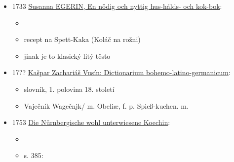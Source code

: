 \begin{itemize}
\begin{itemize}
    \begin{itemize}
    \tightlist
    \item
      Str. 374 citované knihy (s. 59 u Zíbrta):
    \item
      České koláčky (Böhmische Küchlein) Vezme se mléko, mouka a vejce a
      zadělá se těsto. Přidá se trochu droždí a nechá se trochu
      vykynout, pak se zpracuje, aby byl pěkně pevný, a vyválí se do
      šířky. Posype se rozinkami, skořicí, muškátovým květem a
      kardamomem.
    \item
      Poté se vezme rožeň, který je k tomu určen, a opéká se nad ohněm.
      Potře se sádlem, těsto se na něj přehodí a opéká. Na začátku se
      může těsto převázat papírem, aby -- dokud je měkké -- nespadlo z
      rožně.
    \item
      zní to jako kopie Thiemena
    \end{itemize}
  \end{itemize}
\item
  1733
  \href{https://web.archive.org/web/20201229075639/http://www.kurtos.eu/dl/spettakaka.pdf}{Susanna
  EGERIN, En nödig och nyttig hus-hålds- och kok-bok}:

  \begin{itemize}
  \tightlist
  \item
  \item
    recept na Spett-Kaka (Koláč na rožni)
  \item
    jinak je to klasický litý těsto
  \end{itemize}
\item
  17??
  \href{https://bara.ujc.cas.cz/slovniky/VusSlovBLG1729/vusin22.html\#CTX14944}{Kašpar
  Zachariáš Vusín: Dictionarium bohemo-latino-germanicum}:

  \begin{itemize}
  \tightlist
  \item
    slovník, 1. polovina 18. století
  \item
    Vaječník \textbar{} Wagečnjk/ m. Obeliæ, f. p. Spieß-kuchen. m.
  \end{itemize}
\item
  1753
  \href{https://www.digitale-sammlungen.de/de/view/bsb11349274?q=(prugel-krapfen\%20)&page=392\%2C393}{Die
  Nürnbergische wohl unterwiesene Koechin}:

  \begin{itemize}
  \tightlist
  \item
  \item
    s. 385:


\end{itemize}
\end{itemize}
